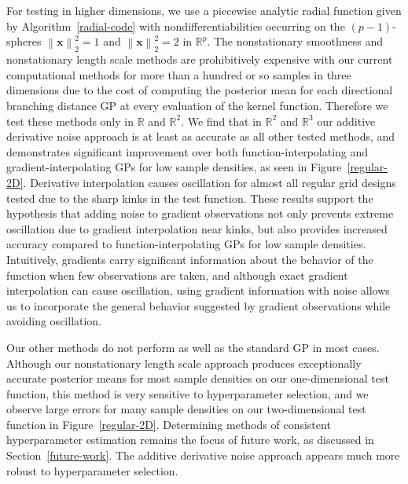 \documentclass{article}
\newcommand{\norm}[1]{\left\lVert#1\right\rVert}
\renewcommand{\vec}[1]{\mathbf{#1}}
\newcommand{\R}{\mathbb{R}}
\numberwithin{equation}{section}
\begin{document}
For testing in higher dimensions, we use a piecewise analytic radial function given by Algorithm~\ref{radial-code} with nondifferentiabilities occurring on the $(p-1)$-spheres $\norm{\vec{x}}_2^2 = 1$ and $\norm{\vec{x}}_2^2 = 2$ in $\R^p$. The nonstationary smoothness and nonstationary length scale methods are prohibitively expensive with our current computational methods for more than a hundred or so samples in three dimensions due to the cost of computing the posterior mean for each directional branching distance GP at every evaluation of the kernel function. Therefore we test these methods only in $\R$ and $\R^2$. We find that in $\R^2$ and $\R^3$ our additive derivative noise approach is at least as accurate as all other tested methods, and demonstrates significant improvement over both function-interpolating and gradient-interpolating GPs for low sample densities, as seen in Figure~\ref{regular-2D}. Derivative interpolation causes oscillation for almost all regular grid designs tested due to the sharp kinks in the test function. These results support the hypothesis that adding noise to gradient observations not only prevents extreme oscillation due to gradient interpolation near kinks, but also provides increased accuracy compared to function-interpolating GPs for low sample densities. Intuitively, gradients carry significant information about the behavior of the function when few observations are taken, and although exact gradient interpolation can cause oscillation, using gradient information with noise allows us to incorporate the general behavior suggested by gradient observations while avoiding oscillation.

Our other methods do not perform as well as the standard GP in most cases. Although our nonstationary length scale approach produces exceptionally accurate posterior means for most sample densities on our one-dimensional test function, this method is very sensitive to hyperparameter selection, and we observe large errors for many sample densities on our two-dimensional test function in Figure~\ref{regular-2D}. Determining methods of consistent hyperparameter estimation remains the focus of future work, as discussed in Section~\ref{future-work}. The additive derivative noise approach appears much more robust to hyperparameter selection.
\end{document}
